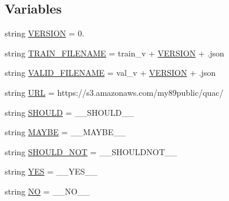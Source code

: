 \subsection*{Variables}
\begin{DoxyCompactItemize}
\item 
string \hyperlink{namespaceparlai_1_1tasks_1_1quac_1_1build_a15040270592a75c3a0a6befc607eda9f}{V\+E\+R\+S\+I\+ON} = \textquotesingle{}0.\textquotesingle{}
\item 
string \hyperlink{namespaceparlai_1_1tasks_1_1quac_1_1build_a951c7eab228e5ba2cbac6dadda0275f9}{T\+R\+A\+I\+N\+\_\+\+F\+I\+L\+E\+N\+A\+ME} = \textquotesingle{}train\+\_\+v\textquotesingle{} + \hyperlink{namespaceparlai_1_1tasks_1_1quac_1_1build_a15040270592a75c3a0a6befc607eda9f}{V\+E\+R\+S\+I\+ON} + \textquotesingle{}.json\textquotesingle{}
\item 
string \hyperlink{namespaceparlai_1_1tasks_1_1quac_1_1build_a346f0d180ce4befa0d432dfca3db6b84}{V\+A\+L\+I\+D\+\_\+\+F\+I\+L\+E\+N\+A\+ME} = \textquotesingle{}val\+\_\+v\textquotesingle{} + \hyperlink{namespaceparlai_1_1tasks_1_1quac_1_1build_a15040270592a75c3a0a6befc607eda9f}{V\+E\+R\+S\+I\+ON} + \textquotesingle{}.json\textquotesingle{}
\item 
string \hyperlink{namespaceparlai_1_1tasks_1_1quac_1_1build_adebd1af1d46eb7d1534dbc98f3ff39ed}{U\+RL} = \textquotesingle{}https\+://s3.\+amazonaws.\+com/my89public/quac/\textquotesingle{}
\item 
string \hyperlink{namespaceparlai_1_1tasks_1_1quac_1_1build_a5f8e1b371211c16c440b76b8ae3f3af6}{S\+H\+O\+U\+LD} = \textquotesingle{}\+\_\+\+\_\+\+S\+H\+O\+U\+L\+D\+\_\+\+\_\+\textquotesingle{}
\item 
string \hyperlink{namespaceparlai_1_1tasks_1_1quac_1_1build_a0591761190bee9bc4e39f88d0f374e86}{M\+A\+Y\+BE} = \textquotesingle{}\+\_\+\+\_\+\+M\+A\+Y\+B\+E\+\_\+\+\_\+\textquotesingle{}
\item 
string \hyperlink{namespaceparlai_1_1tasks_1_1quac_1_1build_af323f9b5375de6cea2bca8b24615a464}{S\+H\+O\+U\+L\+D\+\_\+\+N\+OT} = \textquotesingle{}\+\_\+\+\_\+\+S\+H\+O\+U\+L\+D\+N\+O\+T\+\_\+\+\_\+\textquotesingle{}
\item 
string \hyperlink{namespaceparlai_1_1tasks_1_1quac_1_1build_ae765b76a84d02581f82b38b996795052}{Y\+ES} = \textquotesingle{}\+\_\+\+\_\+\+Y\+E\+S\+\_\+\+\_\+\textquotesingle{}
\item 
string \hyperlink{namespaceparlai_1_1tasks_1_1quac_1_1build_a50beb08d880b27c076327f5a0a26d2e5}{NO} = \textquotesingle{}\+\_\+\+\_\+\+N\+O\+\_\+\+\_\+\textquotesingle{}

\end{DoxyCompactItemize}

